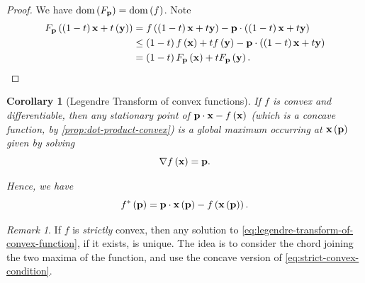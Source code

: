 \documentclass[11pt]{article}
\numberwithin{equation}{section}
\newtheorem{corollary}[theorem]{Corollary}
\theoremstyle{definition}
\theoremstyle{remark}
\newtheorem{remark}[theorem]{Remark}
\newcommand{\pqty}[1]{\left(#1\right)}
\newcommand{\grad}{\nabla}
\newcommand{\vdot}{\cdot}
\newcommand{\legendre}[1]{{#1}^{*}}
\DeclareMathOperator{\dom}{dom}
\begin{document}
\begin{proof}
    We have \(\dom \pqty{F_{\vb{p}}} = \dom \pqty{f}\). Note
    \begin{align*}
        F_{\vb{p}} \pqty{\pqty{1 - t} \vb{x} + t \pqty{\vb{y}}} &= f\pqty{\pqty{1 - t} \vb{x} + t \vb{y}} - \vb{p} \vdot \pqty{\pqty{1 - t} \vb{x} + t \vb{y}} \\
        &\leq \pqty{1 - t} f \pqty{\vb{x}} + t f \pqty{\vb{y}} - \vb{p} \vdot \pqty{\pqty{1 - t} \vb{x} + t \vb{y}} \\
        &= \pqty{1 - t} F_{\vb{p}} \pqty{\vb{x}} + t F_{\vb{p}} \pqty{\vb{y}}.
    \end{align*}
\end{proof}

\begin{corollary}[Legendre Transform of convex functions]\label{variation-unit-0020}
    \label{cor:legendre-transform-of-convex-function}
    If \(f\) is convex and differentiable, then any stationary point of \(\vb{p} \vdot \vb{x} - f \pqty{\vb{x}}\) (which is a concave function, by \autoref{prop:dot-product-convex}) is a global maximum occurring at \(\vb{x} \pqty{\vb{p}}\) given by solving
    \begin{equation}
        \grad f\pqty{\vb{x}} = \vb{p}.
        \label{eq:legendre-transform-of-convex-function}
    \end{equation}

    Hence, we have
    \[
        \legendre{f} \pqty{\vb{p}} = \vb{p} \vdot \vb{x} \pqty{\vb{p}} - f\pqty{\vb{x} \pqty{\vb{p}}}.
    \]
\end{corollary}

\begin{remark}\label{variation-unit-0021}
    If \(f\) is \emph{strictly} convex, then any solution to \autoref{eq:legendre-transform-of-convex-function}, if it exists, is unique. The idea is to consider the chord joining the two maxima of the function, and use the concave version of \autoref{eq:strict-convex-condition}.
\end{remark}
\end{document}
